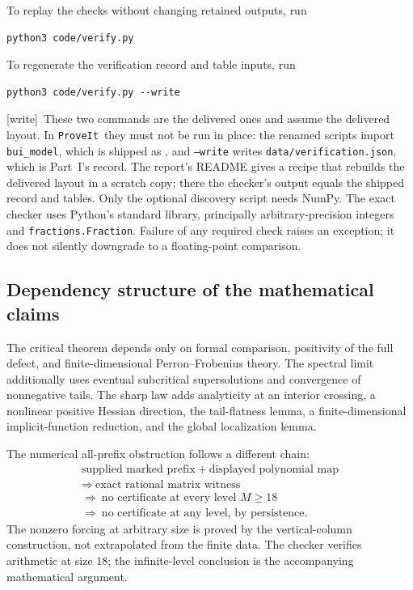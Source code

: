 \documentclass[11pt,a4paper]{article}
\theoremstyle{definition}
\theoremstyle{remark}
\newcommand{\repo}{\texttt{ProveIt}}
\newcommand{\wtag}{\textsf{\small[write]}}
\begin{document}
To replay the checks without changing retained outputs, run
\begin{lstlisting}
python3 code/verify.py
\end{lstlisting}
To regenerate the verification record and table inputs, run
\begin{lstlisting}
python3 code/verify.py --write
\end{lstlisting}
\wtag\ These two commands are the delivered ones and assume the delivered
layout. In \repo\ they must not be run in place: the renamed scripts import
\texttt{bui\_model}, which is shipped as
, and \texttt{--write} writes
\texttt{data/verification.json}, which is Part~I's record. The report's
README gives a recipe that rebuilds the delivered layout in a scratch copy;
there the checker's output equals the shipped record and tables.
Only the optional discovery script needs NumPy. The exact checker uses
Python's standard library, principally arbitrary-precision integers and
\texttt{fractions.Fraction}. Failure of any required check raises an
exception; it does not silently downgrade to a floating-point comparison.

\subsection{Dependency structure of the mathematical claims}
The critical theorem depends only on formal comparison, positivity of the
full defect, and finite-dimensional Perron--Frobenius theory. The spectral
limit additionally uses eventual subcritical supersolutions and convergence
of nonnegative tails. The sharp law adds analyticity at an interior
crossing, a nonlinear positive Hessian direction, the tail-flatness lemma,
a finite-dimensional implicit-function reduction, and the global
localization lemma.

The numerical all-prefix obstruction follows a different chain:
\[
 \begin{gathered}
 \text{supplied marked prefix}\ +\ \text{displayed polynomial map}\\
 \Longrightarrow\ \text{exact rational matrix witness}\\
 \Longrightarrow\ \text{no certificate at every level }M\ge18\\
 \Longrightarrow\ \text{no certificate at any level, by persistence}.
 \end{gathered}
\]
The nonzero forcing at arbitrary size is proved by the vertical-column
construction, not extrapolated from the finite data. The checker verifies
arithmetic at size $18$; the infinite-level conclusion is the accompanying
mathematical argument.
\end{document}

